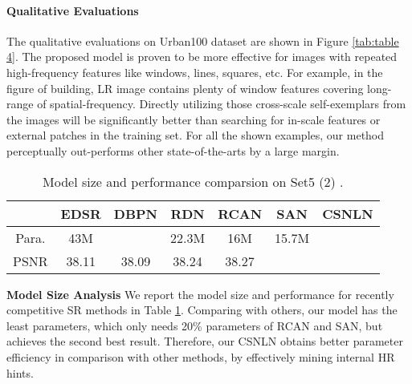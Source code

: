 \documentclass[10pt,twocolumn,letterpaper]{article}
\begin{document}
\paragraph{Qualitative Evaluations}
The qualitative evaluations on Urban100 dataset are shown in Figure \ref{tab:table 4}. The proposed model is proven to be more effective for images with repeated high-frequency features like windows, lines, squares, etc. For example, in the figure of building, LR image contains plenty of window features covering long-range of spatial-frequency. Directly utilizing those cross-scale self-exemplars from the images will be significantly better than searching for in-scale features or external patches in the training set. For all the shown examples, our method perceptually out-performs other state-of-the-arts by a large margin.
\begin{table}[h]
\footnotesize
\centering
    \begin{tabular}{|c|c|c|c|c|c|c|}
    \hline
        &EDSR & DBPN & RDN & RCAN & SAN & CSNLN \\
         \hline
         Para. & 43M & \color{blue}{10M} & 22.3M & 16M & 15.7M & \color{red}{3M}\\
         \hline
         PSNR & 38.11 & 38.09 & 38.24 & 38.27 & \color{red}{38.31} &\color{blue}{38.28}
         \\ \hline
    \end{tabular}
    \caption{Model size and performance comparsion on Set5 (2) .}
    \label{tab:table model}
\end{table}

\noindent\textbf{Model Size Analysis}
We report the model size and performance for recently competitive SR methods in Table \ref{tab:table model}. Comparing with others, our model has the least parameters, which only needs 20\% parameters of RCAN and SAN, but achieves the second best result. Therefore, our CSNLN obtains better parameter efficiency in comparison with other methods, by effectively mining internal HR hints. 
\end{document}
